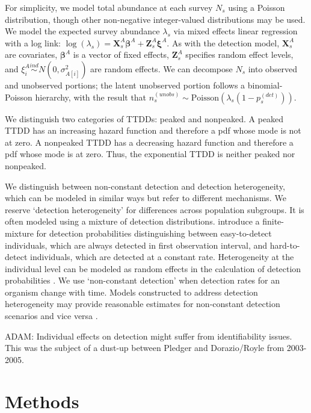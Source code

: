 \documentclass[useAMS,usenatbib,referee,12pt]{article}
\newcommand{\adam}[1]{{\color{blue} ADAM: #1}}
\begin{document}
For simplicity, we model total abundance at each survey $N_{s}$ using a Poisson distribution, though other non-negative integer-valued distributions may be used.  
We model the expected survey abundance $\lambda_{s}$ via mixed effects linear regression with a log link: $\log (\lambda_{s}) = \textbf{X}_{s}^A\boldsymbol{\beta}^A + \textbf{Z}_{s}^A\boldsymbol{\xi}^A$.  As with the detection model, $\textbf{X}_{s}^A$ are covariates, $\boldsymbol{\beta}^A$ is a vector of fixed effects, $\textbf{Z}_{s}^A$ specifies random effect levels, and $\xi_i^A \overset{ind}{\sim} N(0,\sigma_{A[i]}^2)$ are random effects.  
We can decompose $N_{s}$ into observed and unobserved portions; the latent unobserved portion follows a binomial-Poisson hierarchy, with the result that $n_{s}^{(unobs)} \sim \mbox{Poisson}\left(\lambda_{s}(1-p_{s}^{(det)})\right)$.  




We distinguish two categories of TTDDs: peaked and nonpeaked. 
A peaked TTDD has an increasing hazard function and therefore a pdf whose mode is not at zero. 
A nonpeaked TTDD has a decreasing hazard function and therefore a pdf whose mode is at zero.
Thus, the exponential TTDD is neither peaked nor nonpeaked.

We distinguish between non-constant detection and detection heterogeneity, which can be modeled in similar ways but refer to different mechanisms.  
We reserve `detection heterogeneity' for differences across population subgroups.  
It is often modeled using a mixture of detection distributions.  
\citet{Farnsworth2002} introduce a finite-mixture for detection probabilities distinguishing between easy-to-detect individuals, which are always detected in first observation interval, and hard-to-detect individuals, which are detected at a constant rate.  
 Heterogeneity at the individual level can be modeled as random effects in the calculation of detection probabilities \citep{DorazioRoyle2003, Mantyniemi2005}.  
We use `non-constant detection' when detection rates for an organism change with time.  
Models constructed to address detection heterogeneity may provide reasonable estimates for non-constant detection scenarios and vice versa \citep{Mantyniemi2005}.

\adam{Individual effects on detection might suffer from identifiability issues. This was the subject of a dust-up between Pledger and Dorazio/Royle from 2003-2005.}






\section{Methods}\label{sec:model}
\end{document}
